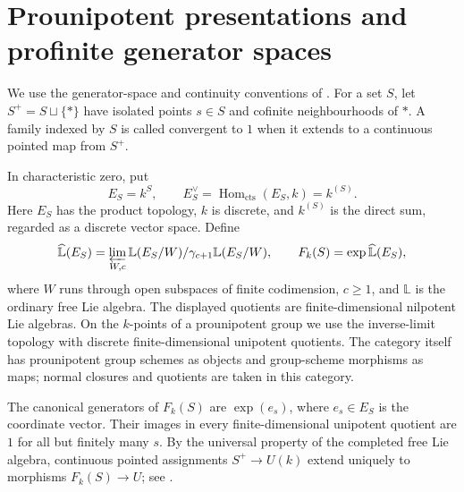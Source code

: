 \documentclass[11pt,a4paper]{article}
\begin{document}

\section{Prounipotent presentations and profinite generator spaces}\label{s5}
We use the generator-space and continuity conventions of
\cite[Sections~1--2]{MikhContinuous}.  For a set $S$, let
$S^+=S\sqcup\{*\}$ have isolated points $s\in S$ and cofinite
neighbourhoods of $*$.  A family indexed by $S$ is called convergent
to $1$ when it extends to a continuous pointed map from $S^+$.

In characteristic zero, put
\[
 E_S=k^S,\qquad E_S^\vee=\operatorname{Hom}_{\mathrm{cts}}(E_S,k)
       =k^{(S)}.
\]
Here $E_S$ has the product topology, $k$ is discrete, and $k^{(S)}$
is the direct sum, regarded as a discrete vector space.  Define
\[
 \widehat{\mathbb L}(E_S)
 =\varprojlim_{W,c}
   \mathbb L(E_S/W)/\gamma_{c+1}\mathbb L(E_S/W),
 \qquad F_k(S)=\exp\widehat{\mathbb L}(E_S),
\]
where $W$ runs through open subspaces of finite codimension, $c\geq1$,
and $\mathbb L$ is the ordinary free Lie algebra.  The displayed
quotients are finite-dimensional nilpotent Lie algebras.  On the
$k$-points of a prounipotent group we use the inverse-limit topology
with discrete finite-dimensional unipotent quotients.  The category
itself has prounipotent group schemes as objects and group-scheme
morphisms as maps; normal closures and quotients are taken in this
category.

The canonical generators of $F_k(S)$ are $\exp(e_s)$, where $e_s\in E_S$
is the coordinate vector.  Their images in every finite-dimensional
unipotent quotient are $1$ for all but finitely many $s$.  By the
universal property of the completed free Lie algebra, continuous
pointed assignments $S^+\to U(k)$ extend uniquely to morphisms
$F_k(S)\to U$; see \cite[Lemma~2.2]{MikhContinuous}.
\end{document}
